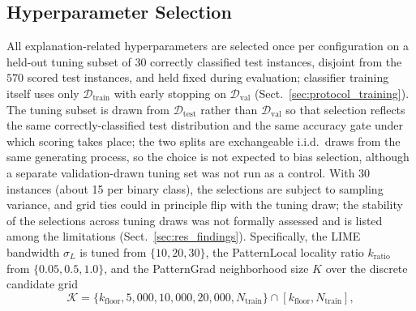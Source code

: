\documentclass[pdflatex,sn-mathphys-num]{sn-jnl}
\theoremstyle{thmstyleone}
\theoremstyle{thmstyletwo}%
\theoremstyle{thmstylethree}%
\begin{document}
\subsection{Hyperparameter Selection}\label{sec:hyper}

All explanation-related hyperparameters are selected once per configuration on a held-out tuning subset of $30$ correctly classified test instances, disjoint from the $570$ scored test instances, and held fixed during evaluation; classifier training itself uses only $\mathcal{D}_{\text{train}}$ with early stopping on $\mathcal{D}_{\text{val}}$ (Sect.~\ref{sec:protocol_training}). The tuning subset is drawn from $\mathcal{D}_{\text{test}}$ rather than $\mathcal{D}_{\text{val}}$ so that selection reflects the same correctly-classified test distribution and the same accuracy gate under which scoring takes place; the two splits are exchangeable i.i.d.\ draws from the same generating process, so the choice is not expected to bias selection, although a separate validation-drawn tuning set was not run as a control. With 30 instances (about 15 per binary class), the selections are subject to sampling variance, and grid ties could in principle flip with the tuning draw; the stability of the selections across tuning draws was not formally assessed and is listed among the limitations (Sect.~\ref{sec:res_findings}). Specifically, the LIME bandwidth $\sigma_L$ is tuned from $\{10, 20, 30\}$, the PatternLocal locality ratio $k_{\text{ratio}}$ from $\{0.05, 0.5, 1.0\}$, and the PatternGrad neighborhood size $K$ over the discrete candidate grid
\begin{equation*}
    \mathcal{K} = \{k_{\text{floor}}, 5{,}000, 10{,}000, 20{,}000, N_{\text{train}}\} \cap [k_{\text{floor}}, N_{\text{train}}],
\end{equation*}
\end{document}
